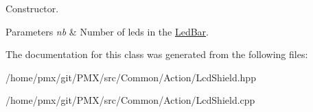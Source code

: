Constructor. 


\begin{DoxyParams}{Parameters}
{\em nb} & Number of leds in the \hyperlink{classLedBar}{Led\+Bar}. \\
\hline
\end{DoxyParams}


The documentation for this class was generated from the following files\+:\begin{DoxyCompactItemize}
\item 
/home/pmx/git/\+P\+M\+X/src/\+Common/\+Action/Lcd\+Shield.\+hpp\item 
/home/pmx/git/\+P\+M\+X/src/\+Common/\+Action/Lcd\+Shield.\+cpp\end{DoxyCompactItemize}
